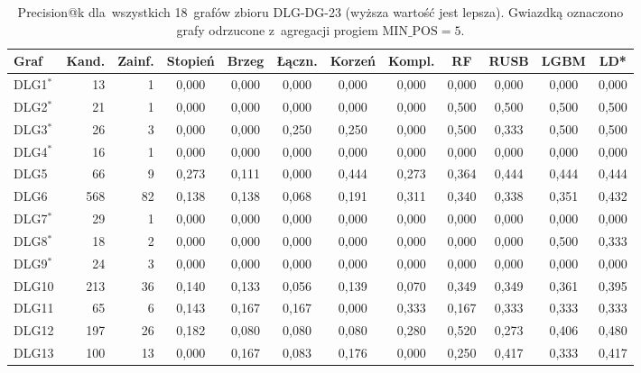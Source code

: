 \begin{table}[ht]
\centering
\caption{Precision@k dla~wszystkich 18~grafów zbioru DLG-DG-23 (wyższa wartość jest lepsza). Gwiazdką oznaczono grafy odrzucone z~agregacji progiem $\mathrm{MIN\_POS} = 5$.}
\label{tab:dodb-precision-at-k}
\footnotesize
\setlength{\tabcolsep}{3.5pt}
\begin{tabular}{lrrccccccccc}
\toprule
\textbf{Graf} & \textbf{Kand.} & \textbf{Zainf.} & \textbf{Stopień} & \textbf{Brzeg} & \textbf{Łączn.} & \textbf{Korzeń} & \textbf{Kompl.} & \textbf{RF} & \textbf{RUSB} & \textbf{LGBM} & \textbf{LD*} \\
\midrule
DLG1$^{*}$ & 13 & 1 & 0{,}000 & 0{,}000 & 0{,}000 & 0{,}000 & 0{,}000 & 0{,}000 & 0{,}000 & 0{,}000 & 0{,}000 \\
DLG2$^{*}$ & 21 & 1 & 0{,}000 & 0{,}000 & 0{,}000 & 0{,}000 & 0{,}000 & 0{,}500 & 0{,}500 & 0{,}500 & 0{,}500 \\
DLG3$^{*}$ & 26 & 3 & 0{,}000 & 0{,}000 & 0{,}250 & 0{,}250 & 0{,}000 & 0{,}500 & 0{,}333 & 0{,}500 & 0{,}500 \\
DLG4$^{*}$ & 16 & 1 & 0{,}000 & 0{,}000 & 0{,}000 & 0{,}000 & 0{,}000 & 0{,}000 & 0{,}000 & 0{,}000 & 0{,}000 \\
DLG5 & 66 & 9 & 0{,}273 & 0{,}111 & 0{,}000 & 0{,}444 & 0{,}273 & 0{,}364 & 0{,}444 & 0{,}444 & 0{,}444 \\
DLG6 & 568 & 82 & 0{,}138 & 0{,}138 & 0{,}068 & 0{,}191 & 0{,}311 & 0{,}340 & 0{,}338 & 0{,}351 & 0{,}432 \\
DLG7$^{*}$ & 29 & 1 & 0{,}000 & 0{,}000 & 0{,}000 & 0{,}000 & 0{,}000 & 0{,}000 & 0{,}000 & 0{,}000 & 0{,}000 \\
DLG8$^{*}$ & 18 & 2 & 0{,}000 & 0{,}000 & 0{,}000 & 0{,}000 & 0{,}000 & 0{,}000 & 0{,}000 & 0{,}500 & 0{,}333 \\
DLG9$^{*}$ & 24 & 3 & 0{,}000 & 0{,}000 & 0{,}000 & 0{,}000 & 0{,}000 & 0{,}000 & 0{,}000 & 0{,}000 & 0{,}000 \\
DLG10 & 213 & 36 & 0{,}140 & 0{,}133 & 0{,}056 & 0{,}139 & 0{,}070 & 0{,}349 & 0{,}349 & 0{,}361 & 0{,}395 \\
DLG11 & 65 & 6 & 0{,}143 & 0{,}167 & 0{,}167 & 0{,}000 & 0{,}333 & 0{,}167 & 0{,}333 & 0{,}333 & 0{,}333 \\
DLG12 & 197 & 26 & 0{,}182 & 0{,}080 & 0{,}080 & 0{,}080 & 0{,}280 & 0{,}520 & 0{,}273 & 0{,}406 & 0{,}480 \\
DLG13 & 100 & 13 & 0{,}000 & 0{,}167 & 0{,}083 & 0{,}176 & 0{,}000 & 0{,}250 & 0{,}417 & 0{,}333 & 0{,}417 \\

\end{tabular}
\end{table}
